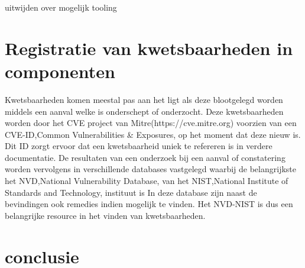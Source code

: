 uitwijden over mogelijk tooling
\section{Registratie van kwetsbaarheden in componenten}\label{sec:registratie-van-kwetsbaarheden-in-bibliotheken}
Kwetsbaarheden komen meestal pas aan het ligt als deze blootgelegd worden middels een aanval welke is onderschept of onderzocht. Deze kwetsbaarheden worden door het CVE project van Mitre(https://cve.mitre.org) voorzien van een CVE-ID,Common Vulnerabilities & Exposures, op het moment dat deze nieuw is. Dit ID zorgt ervoor dat een kwetsbaarheid uniek te refereren is in verdere documentatie. De resultaten van een onderzoek bij een aanval of constatering worden vervolgens in verschillende databases vastgelegd waarbij de belangrijkste het NVD,National Vulnerability Database,  van het NIST,National Institute of Standards and Technology, instituut is
In deze database zijn naast de bevindingen ook remedies indien mogelijk te vinden. Het NVD-NIST is dus een belangrijke resource in het vinden van kwetsbaarheden.


\section{conclusie}\label{sec:conclusie}
